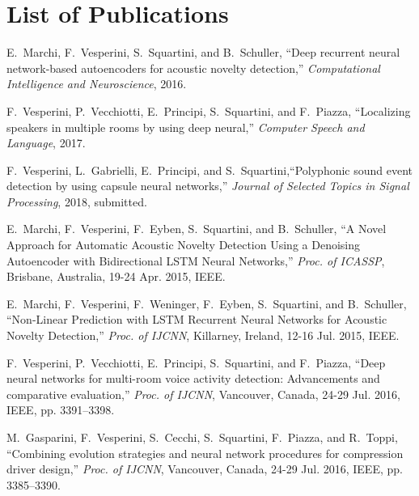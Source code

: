 \chapter*{List of Publications}
\pagestyle{plain}


\begin{list}{[]~}{}

\item
E.~Marchi, F.~Vesperini, S.~Squartini, and B.~Schuller, ``Deep recurrent neural network-based autoencoders for acoustic novelty detection,'' \emph{Computational Intelligence and Neuroscience}, 2016.

\item
F.~Vesperini, P.~Vecchiotti, E.~Principi, S.~Squartini, and F.~Piazza, ``Localizing speakers in multiple rooms by using deep neural,'' \emph{Computer Speech and Language}, 2017.

\item
F.~Vesperini, L.~Gabrielli, E.~Principi, and S.~Squartini,``Polyphonic sound event detection by using capsule neural networks,'' \emph{Journal of Selected Topics in Signal Processing}, 2018, submitted.

\item
E.~Marchi, F.~Vesperini, F.~Eyben, S.~Squartini, and B.~Schuller, ``A Novel Approach for Automatic Acoustic Novelty Detection Using a Denoising Autoencoder with Bidirectional LSTM Neural Networks,'' \emph{Proc. of ICASSP}, Brisbane, Australia, 19-24 Apr. 2015, IEEE.

\item
E.~Marchi, F.~Vesperini, F.~Weninger, F.~Eyben, S.~Squartini, and B.~Schuller, ``Non-Linear Prediction with LSTM Recurrent Neural Networks for Acoustic Novelty Detection,'' \emph{Proc. of IJCNN}, Killarney, Ireland, 12-16 Jul. 2015, IEEE.

\item
F.~Vesperini, P.~Vecchiotti, E.~Principi, S.~Squartini, and F.~Piazza, ``Deep neural networks for multi-room voice activity detection: Advancements and comparative evaluation,'' \emph{Proc. of IJCNN}, Vancouver, Canada, 24-29 Jul. 2016, IEEE, pp. 3391--3398.

\item
M.~Gasparini, F.~Vesperini, S.~Cecchi, S.~Squartini, F.~Piazza, and R.~Toppi, ``Combining evolution strategies and neural network procedures for compression driver design,'' \emph{Proc. of IJCNN}, Vancouver, Canada, 24-29 Jul. 2016, IEEE, pp. 3385--3390.


\end{list}
